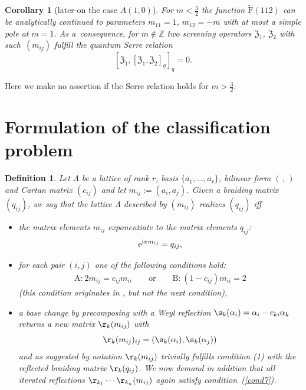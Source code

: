 \documentclass[10pt,a4paper]{amsart}
\numberwithin{equation}{section}
\newtheorem{cor}[teo]{Corollary}
\newtheorem{defin}[teo]{Definition}
\newcommand{\Z}{\mathbb{Z}}
\newcommand{\zem}{\mathfrak{Z}}
\newcommand{\rFp}{\tilde{\mathrm{F}}}
\begin{document}
\begin{cor}[later-on the case $A(1,0)$]\label{cor_A10}
For $m<\frac{3}{2}$ the function $\rFp(112)$ can be analytically continued to parameters $m_{11}=1$, $m_{12}=-m$ with at most a simple pole at $m=1$. As a~consequence, for $m\not\in \Z$ two screening operators $\zem_1$, $\zem_2$ with such~$(m_{ij})$ fulfill the quantum Serre relation
	\[[\zem_1,[\zem_1,\zem_2]_q]_q=0.\]
\end{cor}

Here we make no assertion if the Serre relation holds for $m>\frac{3}{2}$.

\section{Formulation of the classification problem}\label{section5}
\begin{defin}\label{Mm} Let $\Lambda$ be a lattice of rank $r$, basis $\{a_1, \dots, a_r\}$, bilinear form $(\,,\,)$ and Cartan matrix $(c_{ij})$ and let $m_{ij}:=(a_i, a_j)$. Given a braiding matrix $(q_{ij})$, we say that the lattice $\Lambda$ described by $(m_{ij})$ \emph{realizes} $(q_{ij})$ iff
\begin{itemize}\itemsep=0pt
	\item the matrix elements $m_{ij}$ exponentiate to the matrix elements $q_{ij}$:
	\[{\rm e}^{{\rm i}\pi m_{ij}} = q_{ij},\]
	\item for each pair $(i,j)$ one of the following conditions hold: \begin{align}\label{cond7}
\text{A:} \ 2m_{ij} = c_{ij} m_{ii} \qquad \text{or} \qquad \text{B:} \ (1-c_{ij})m_{ii} = 2
\end{align}
(this condition originates in \cite{Sem14}, but not the next condition),
	\item a base change by precomposing with a Weyl reflection $\s_k(\alpha_i)=\alpha_i-c_{ki}\alpha_k$
	returns a new matrix $\r_k(m_{ij})$ with
	\[\r_k(m_{ij})_{ij}=(\s_k(\alpha_i),\s_k(\alpha_j))\]
	and as suggested by notation $\r_k(m_{ij})$ trivially fulfills condition (1) with the reflected braiding matrix $\r_k(q_{ij})$.
 We now demand in addition that all iterated reflections $\r_{k_1}\cdots\r_{k_n}(m_{ij})$ again satisfy condition~(\ref{cond7}).
\end{itemize}
\end{defin}
\end{document}
